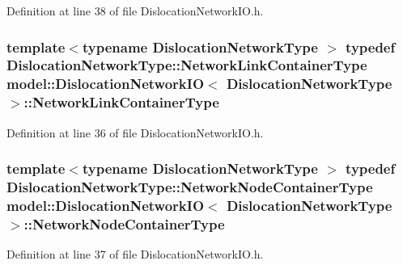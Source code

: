 Definition at line 38 of file Dislocation\+Network\+I\+O.\+h.

\hypertarget{structmodel_1_1_dislocation_network_i_o_a9b6f8cbe67a3cda440575dfb86995fff}{}
\subsubsection[{Network\+Link\+Container\+Type}]{\setlength{\rightskip}{0pt plus 5cm}template$<$typename Dislocation\+Network\+Type $>$ typedef Dislocation\+Network\+Type\+::\+Network\+Link\+Container\+Type {\bf model\+::\+Dislocation\+Network\+I\+O}$<$ Dislocation\+Network\+Type $>$\+::{\bf Network\+Link\+Container\+Type}}\label{structmodel_1_1_dislocation_network_i_o_a9b6f8cbe67a3cda440575dfb86995fff}


Definition at line 36 of file Dislocation\+Network\+I\+O.\+h.

\hypertarget{structmodel_1_1_dislocation_network_i_o_aaf3c85244251a934db165b29f0319e6d}{}
\subsubsection[{Network\+Node\+Container\+Type}]{\setlength{\rightskip}{0pt plus 5cm}template$<$typename Dislocation\+Network\+Type $>$ typedef Dislocation\+Network\+Type\+::\+Network\+Node\+Container\+Type {\bf model\+::\+Dislocation\+Network\+I\+O}$<$ Dislocation\+Network\+Type $>$\+::{\bf Network\+Node\+Container\+Type}}\label{structmodel_1_1_dislocation_network_i_o_aaf3c85244251a934db165b29f0319e6d}


Definition at line 37 of file Dislocation\+Network\+I\+O.\+h.

\hypertarget{structmodel_1_1_dislocation_network_i_o_a33463e36c65dfbad3e7f656a83e6ac58}{}
